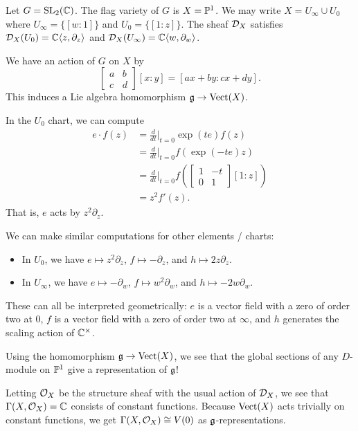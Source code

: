 \documentclass{article}
\begin{document}
Let $G = \operatorname{SL}_2(\mathbb{C})$.
The flag variety of $G$ is $X = \mathbb{P}^1$.
We may write $X = U_\infty \cup U_0$ where $U_\infty = \{ [w : 1] \}$ and $U_0 = \{ [1 : z] \}$.
The sheaf $\mathcal{D}_X$ satisfies $\mathcal{D}_X(U_0) = \mathbb{C}\langle z, \partial_z \rangle$ and $\mathcal{D}_X(U_\infty) = \mathbb{C}\langle w, \partial_w \rangle$.

We have an action of $G$ on $X$ by
\[
	\begin{bmatrix}
		a & b \\
		c & d
	\end{bmatrix}
	[x : y] = [ax + by : cx + dy].
\]
This induces a Lie algebra homomorphism $\mathfrak{g} \to \mathrm{Vect}(X)$.

In the $U_0$ chart, we can compute
\begin{align*}
	e \cdot f(z) &= \frac{d}{dt}\bigg|_{t=0} \exp(te) f(z) \\
		     &= \frac{d}{dt}\bigg|_{t=0} f(\exp(-te) z) \\
		     &= \frac{d}{dt}\bigg|_{t=0} f\left(\begin{bmatrix}1 & -t\\ 0 & 1\end{bmatrix} [1 : z]\right) \\
		     &= z^2 f'(z).
\end{align*}
That is, $e$ acts by $z^2 \partial_z$.

We can make similar computations for other elements / charts: 
\begin{itemize}
	\item In $U_0$, we have $e \mapsto z^2 \partial_z$, $f \mapsto -\partial_z$, and $h \mapsto 2z\partial_z$.
	\item In $U_\infty$, we have $e \mapsto -\partial_w$, $f \mapsto w^2 \partial_w$, and $h \mapsto -2w\partial_w$.
\end{itemize}
These can all be interpreted geometrically: $e$ is a vector field with a zero of order two at $0$, $f$ is a vector field with a zero of order two at $\infty$, and $h$ generates the scaling action of $\mathbb{C}^\times$.

Using the homomorphism $\mathfrak{g} \to \mathrm{Vect}(X)$, we see that the global sections of any $D$-module on $\mathbb{P}^1$ give a representation of $\mathfrak{g}$!

\begin{ex}
	Letting $\mathcal{O}_X$ be the structure sheaf with the usual action of $\mathcal{D}_X$, we see that $\Gamma(X, \mathcal{O}_X) = \mathbb{C}$ consists of constant functions.
	Because $\mathrm{Vect}(X)$ acts trivially on constant functions, we get $\Gamma(X, \mathcal{O}_X) \cong V(0)$ as $\mathfrak{g}$-representations.
\end{ex}
\end{document}
